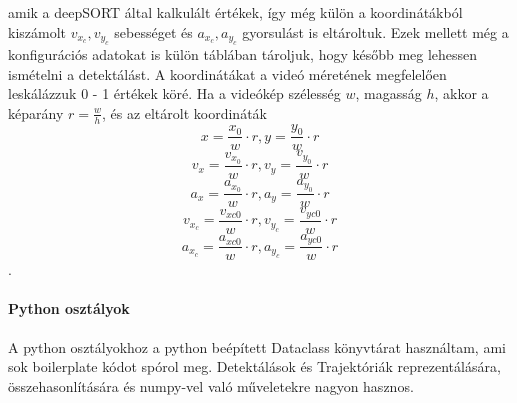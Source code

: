 \documentclass[12pt,a4paper]{article}
\begin{document}
amik a deepSORT által kalkulált értékek, így még külön a koordinátákból kiszámolt \begin{math}v_{x_c},v_{y_c}\end{math} sebességet és
\begin{math}a_{x_c},a_{y_c}\end{math} gyorsulást is eltároltuk.
Ezek mellett még a konfigurációs adatokat is külön táblában tároljuk, hogy később meg lehessen ismételni a detektálást.
A koordinátákat a videó méretének megfelelően leskálázzuk 0 - 1 értékek köré. Ha a videókép szélesség \begin{math}w\end{math}, magasság \begin{math}h\end{math},
akkor a képarány \begin{math}r = \frac{w}{h}\end{math}, és az eltárolt koordináták
\newpage
\begin{equation}x = \frac{x_0}{w} \cdot r, y = \frac{y_0}{w} \cdot r\end{equation}
\begin{equation}v_x = \frac{v_{x_0}}{w} \cdot r, v_y = \frac{v_{y_0}}{w} \cdot r\end{equation}
\begin{equation}a_x = \frac{a_{x_0}}{w} \cdot r, a_y = \frac{a_{y_0}}{w} \cdot r\end{equation}
\begin{equation}v_{x_c} = \frac{v_{xc0}}{w} \cdot r, v_{y_c} = \frac{v_{yc0}}{w} \cdot r\end{equation}
\begin{equation}a_{x_c} = \frac{a_{xc0}}{w} \cdot r, a_{y_c} = \frac{a_{yc0}}{w} \cdot r\end{equation}.

\paragraph{Python osztályok} A python osztályokhoz a python beépített Dataclass könyvtárat használtam, ami sok boilerplate kódot spórol meg.
Detektálások és Trajektóriák reprezentálására, összehasonlítására és numpy-vel való műveletekre nagyon hasznos. 
\end{document}
